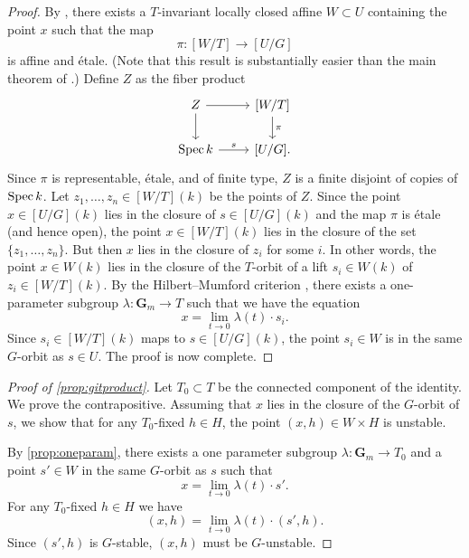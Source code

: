 \documentclass[11pt,reqno, letterpaper]{amsart}
\renewcommand{\k}{k}
\renewcommand{\to}{{\longrightarrow}}
\numberwithin{equation}{section}
\newcommand{\G}{\mathbf G}
\begin{document}
\begin{proof}
  By \cite[Theorem~3]{alp:10}, there exists a $T$-invariant locally closed affine $W \subset U$ containing the point $x$ such that the map
  \[ \pi \colon [W/T] \to [U / G]\]
  is affine and \'etale.
  (Note that this result is substantially easier than the main theorem of \cite{alp.hal.ryd:20}.)
  Define $Z$ as the fiber product
  \[
    \begin{tikzcd}
      Z \ar{r}\ar{d}& {[W/T]}\ar{d}{\pi}\\
      \spec \k \ar{r}{s}& {[U/G]}.
    \end{tikzcd}
  \]
  Since $\pi$ is representable, \'etale, and of finite type, $Z$ is a finite disjoint of copies of $\spec \k$.
  Let $z_1, \dots, z_n \in [W/T](\k)$ be the points of $Z$.
  Since the point $x \in [U/G](\k)$ lies in the closure of $s \in [U/G](\k)$ and the map $\pi$ is \'etale (and hence open), the point $x \in [W/T](\k)$ lies in the closure of the set $\{z_1,\dots, z_n\}$.
  But then $x$ lies in the closure of $z_i$ for some $i$.
  In other words, the point $x \in W(\k)$ lies in the closure of the $T$-orbit of a lift $s_i \in W(\k)$ of $z_i \in [W/T](\k)$.
  By the Hilbert--Mumford criterion \cite[Theorem~1.4]{kem:78}, there exists a one-parameter subgroup $\lambda \colon \G_m \to T$ such that we have the equation
  \begin{equation}\label{eqn:specialization}
    x = \lim_{t \to 0} \lambda (t) \cdot s_i.
  \end{equation}
  Since $s_i \in [W/T](\k)$ maps to $s \in [U/G](\k)$, the point $s_i \in W$ is in the same $G$-orbit as $s \in U$.
  The proof is now complete.
\end{proof}

\begin{proof}[Proof of \autoref{prop:gitproduct}]
  Let $T_0 \subset T$ be the connected  component of the identity.
  We prove the contrapositive.
  Assuming that $x$ lies in the closure of the $G$-orbit of $s$, we show that for any $T_0$-fixed $h \in H$, the point $(x, h) \in W \times H$ is unstable.

  By \autoref{prop:oneparam}, there exists a one parameter subgroup $\lambda \colon \G_m \to T_0$ and a point $s' \in W$ in the same $G$-orbit as $s$ such that
  \[ x = \lim_{t \to 0} \lambda(t) \cdot s'.\]
  For any $T_0$-fixed $h \in H$ we have
  \[
    (x, h) = \lim_{t \to 0} \lambda(t) \cdot (s', h).
  \]
  Since $(s',h)$ is $G$-stable, $(x,h)$ must be $G$-unstable.
\end{proof}
\end{document}
